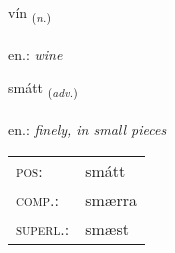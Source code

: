 \documentclass[frontgrid, backgrid]{flacards}\usepackage[]{graphicx}\usepackage[]{xcolor}
\begin{document}
\renewcommand{\flhead}{\vskip5pt \fboxsep=0pt {\small\bfseries\footnotesize Nafnorð | Noun}}
\renewcommand{\fcfoot}{\vskip5pt \fboxsep=0pt \hspace{2pt}{\small\bfseries\footnotesize 2K}}

\renewcommand{\blhead}{\vskip5pt {\small\bfseries\footnotesize Nafnorð | Noun }}
\renewcommand{\bcfoot}{\vskip5pt \hspace{2pt}{\small\bfseries\footnotesize 2K}}


{vín \small{\textsubscript{(\textit{n.})}} \\[1ex] %
\textphonetic{[viːn]} \\
en.: \emph{wine} \\  [2ex]
\renewcommand*{\arraystretch}{0.8}
}

\renewcommand{\flhead}{\vskip5pt \fboxsep=0pt {\small\bfseries\footnotesize Atviksorð | Adverb}}
\renewcommand{\fcfoot}{\vskip5pt \fboxsep=0pt \hspace{2pt}{\small\bfseries\footnotesize 2K}}

\renewcommand{\blhead}{\vskip5pt {\small\bfseries\footnotesize Atviksorð | Adverb }}
\renewcommand{\bcfoot}{\vskip5pt \hspace{2pt}{\small\bfseries\footnotesize 2K}}


{smátt \small{\textsubscript{(\textit{adv.})}} \\[1ex] %
\textphonetic{[smauht]} \\
en.: \emph{finely, in small pieces} \\  [2ex]
\renewcommand*{\arraystretch}{0.8}
\begin{tabular}{ll}
\textsc{pos}: & smátt \\ 
\textsc{comp.}: & smærra \\ 
\textsc{superl.}: & smæst \\
\end{tabular}
}
\end{document}
